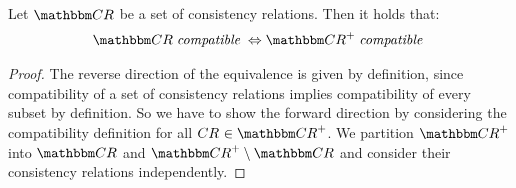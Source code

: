 \begin{lemma} \label{lemma:compatibilitytransitiveclosure}
    Let $\consistencyrelationset{CR}$ be a set of consistency relations.
    Then it holds that:
    \begin{align*}
        \consistencyrelationset{CR} \compatiblemath \equivalent
        \transitiveclosure{\consistencyrelationset{CR}} \compatiblemath
    \end{align*}
\end{lemma}

\begin{proof}
    The reverse direction of the equivalence is given by definition, since compatibility of a set of consistency relations implies compatibility of every subset by definition.
    So we have to show the forward direction by considering the compatibility definition for all $\consistencyrelation{CR}{} \in \transitiveclosure{\consistencyrelationset{CR}}$.
    We partition $\transitiveclosure{\consistencyrelationset{CR}}$ into $\consistencyrelationset{CR}$ and $\transitiveclosure{\consistencyrelationset{CR}} \setminus \consistencyrelationset{CR}$ and consider their consistency relations independently.
    

\end{proof}
